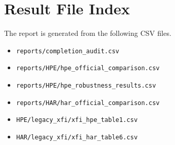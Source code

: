 \section{Result File Index}
The report is generated from the following CSV files.
\begin{itemize}
\item \texttt{reports/completion\_audit.csv}
\item \texttt{reports/HPE/hpe\_official\_comparison.csv}
\item \texttt{reports/HPE/hpe\_robustness\_results.csv}
\item \texttt{reports/HAR/har\_official\_comparison.csv}
\item \texttt{HPE/legacy\_xfi/xfi\_hpe\_table1.csv}
\item \texttt{HAR/legacy\_xfi/xfi\_har\_table6.csv}
\end{itemize}
